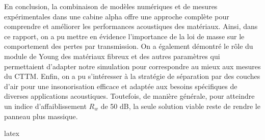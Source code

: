 
\vfill

    En conclusion, la combinaison de modèles numériques et de mesures expérimentales dans une cabine alpha offre une approche complète pour comprendre et améliorer les performances acoustiques des matériaux. Ainsi, dans ce rapport, on a pu mettre en évidence l'importance de la loi de masse sur le comportement des pertes par transmission. On a également démontré le rôle du module de Young des matériaux fibreux et des autres paramètres qui permettaient d'adapter notre simulation pour correspondre au mieux aux mesures du CTTM. Enfin, on a pu s'intéresser à la stratégie de séparation par des couches d'air pour une insonorisation efficace et adaptée aux besoins spécifiques de diverses applications acoustiques. Toutefois, de manière générale, pour atteindre un indice d'affaiblissement $R_{w}$ de 50 dB, la seule solution viable reste de rendre le panneau plus massique.

    \gls{latex}

\vfill